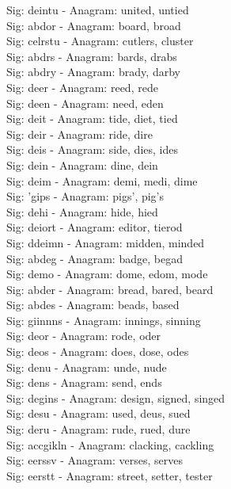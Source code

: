 Sig: {deintu} - Anagram: united, untied \\
Sig: {abdor} - Anagram: board, broad \\
Sig: {celrstu} - Anagram: cutlers, cluster \\
Sig: {abdrs} - Anagram: bards, drabs \\
Sig: {abdry} - Anagram: brady, darby \\
Sig: {deer} - Anagram: reed, rede \\
Sig: {deen} - Anagram: need, eden \\
Sig: {deit} - Anagram: tide, diet, tied \\
Sig: {deir} - Anagram: ride, dire \\
Sig: {deis} - Anagram: side, dies, ides \\
Sig: {dein} - Anagram: dine, dein \\
Sig: {deim} - Anagram: demi, medi, dime \\
Sig: {'gips} - Anagram: pigs', pig's \\
Sig: {dehi} - Anagram: hide, hied \\
Sig: {deiort} - Anagram: editor, tierod \\
Sig: {ddeimn} - Anagram: midden, minded \\
Sig: {abdeg} - Anagram: badge, begad \\
Sig: {demo} - Anagram: dome, edom, mode \\
Sig: {abder} - Anagram: bread, bared, beard \\
Sig: {abdes} - Anagram: beads, based \\
Sig: {giinnns} - Anagram: innings, sinning \\
Sig: {deor} - Anagram: rode, oder \\
Sig: {deos} - Anagram: does, dose, odes \\
Sig: {denu} - Anagram: unde, nude \\
Sig: {dens} - Anagram: send, ends \\
Sig: {degins} - Anagram: design, signed, singed \\
Sig: {desu} - Anagram: used, deus, sued \\
Sig: {deru} - Anagram: rude, rued, dure \\
Sig: {accgikln} - Anagram: clacking, cackling \\
Sig: {eerssv} - Anagram: verses, serves \\
Sig: {eerstt} - Anagram: street, setter, tester \\
